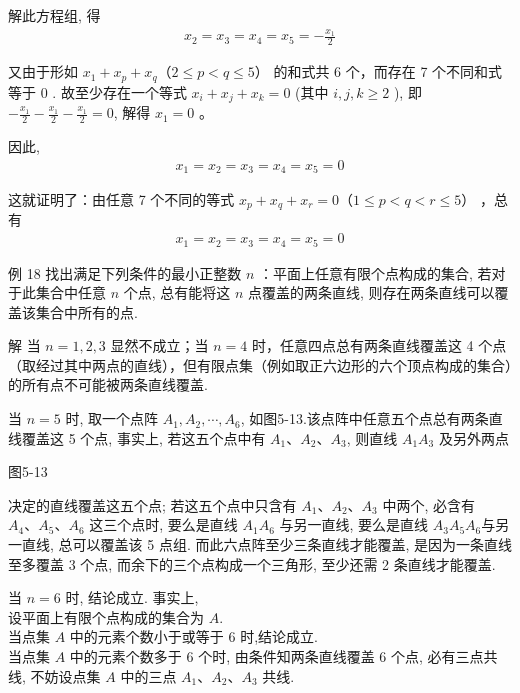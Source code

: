 \documentclass[10pt]{article}
\begin{document}
解此方程组, 得\\
\begin{align*}
x_{2}=x_{3}=x_{4}=x_{5}=-\frac{x_{1}}{2}
\end{align*}

又由于形如 $x_{1}+x_{p}+x_{q} （ 2 \leqslant p<q \leqslant 5 ）$ 的和式共 6 个，而存在 7 个不同和式等于 0 . 故至少存在一个等式 $x_{i}+x_{j}+x_{k}=0$ (其中 $i, j, k \geqslant 2$ ), 即 $-\frac{x_{1}}{2}-\frac{x_{1}}{2}-\frac{x_{1}}{2}=0$, 解得 $x_{1}=0$ 。

因此,\\
\begin{align*}
x_{1}=x_{2}=x_{3}=x_{4}=x_{5}=0
\end{align*}

这就证明了：由任意 7 个不同的等式 $x_{p}+x_{q}+x_{r}=0 （ 1 \leqslant p<q<r \leqslant 5 ）$ ，总有\\
\begin{align*}
x_{1}=x_{2}=x_{3}=x_{4}=x_{5}=0
\end{align*}

例 18 找出满足下列条件的最小正整数 $n$ ：平面上任意有限个点构成的集合, 若对于此集合中任意 $n$ 个点, 总有能将这 $n$ 点覆盖的两条直线, 则存在两条直线可以覆盖该集合中所有的点.

解 当 $n=1,2,3$ 显然不成立；当 $n=4$ 时，任意四点总有两条直线覆盖这 4 个点（取经过其中两点的直线），但有限点集（例如取正六边形的六个顶点构成的集合）的所有点不可能被两条直线覆盖.

当 $n=5$ 时, 取一个点阵 $A_{1}, A_{2}, \cdots, A_{6}$, 如图5-13.该点阵中任意五个点总有两条直线覆盖这 5 个点, 事实上, 若这五个点中有 $A_{1} 、 A_{2} 、 A_{3}$, 则直线 $A_{1} A_{3}$ 及另外两点

图5-13

决定的直线覆盖这五个点; 若这五个点中只含有 $A_{1} 、 A_{2} 、 A_{3}$ 中两个, 必含有 $A_{4} 、 A_{5} 、 A_{6}$ 这三个点时, 要么是直线 $A_{1} A_{6}$ 与另一直线, 要么是直线 $A_{3} A_{5} A_{6}$与另一直线, 总可以覆盖该 5 点组. 而此六点阵至少三条直线才能覆盖, 是因为一条直线至多覆盖 3 个点, 而余下的三个点构成一个三角形, 至少还需 2 条直线才能覆盖.

当 $n=6$ 时, 结论成立. 事实上,\\
设平面上有限个点构成的集合为 $A$.\\
当点集 $A$ 中的元素个数小于或等于 6 时,结论成立.\\
当点集 $A$ 中的元素个数多于 6 个时, 由条件知两条直线覆盖 6 个点, 必有三点共线, 不妨设点集 $A$ 中的三点 $A_{1} 、 A_{2} 、 A_{3}$ 共线.
\end{document}

